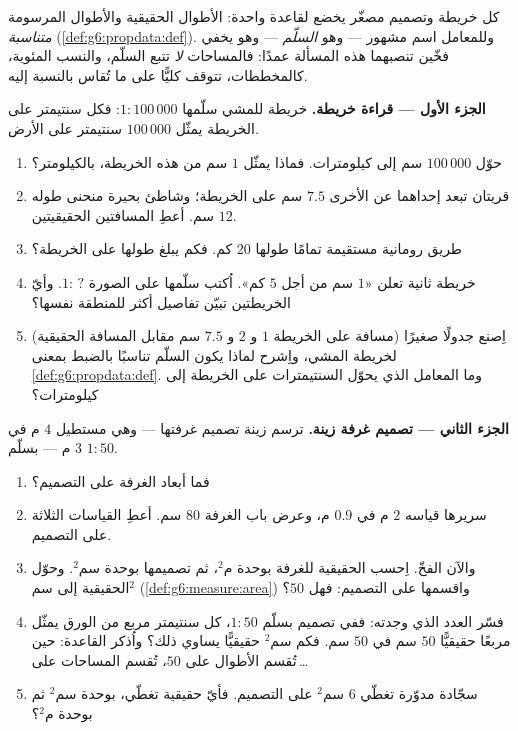 \begin{problem}
\label{pb:g6:propdata:1}
كل خريطة وتصميم  مصغّر يخضع لقاعدة واحدة: الأطوال الحقيقية
والأطوال المرسومة \emph{متناسبة}
(\cref{def:g6:propdata:def}). وللمعامل اسم مشهور
--- وهو \emph{السلّم} --- وهو يخفي فخّين
تنصبهما هذه المسألة عمدًا: فالمساحات \emph{لا} تتبع
السلّم، والنسب المئوية، كالمخططات، تتوقف كليًّا على ما
تُقاس بالنسبة إليه.

\medskip
\noindent\textbf{الجزء الأول --- قراءة خريطة.}
خريطة للمشي سلّمها $1:100\,000$: فكل سنتيمتر على الخريطة
يمثّل $100\,000$ سنتيمتر على الأرض.
\begin{enumerate}
  \item حوّل $100\,000$ سم إلى كيلومترات. فماذا يمثّل $1$ سم
        من هذه الخريطة، بالكيلومتر؟
  \item قريتان تبعد إحداهما عن الأخرى $7.5$ سم على الخريطة؛ وشاطئ
        بحيرة منحنى طوله $12$ سم. أعطِ المسافتين الحقيقيتين.
  \item طريق رومانية مستقيمة تمامًا طولها $20$ كم. فكم يبلغ طولها
        على الخريطة؟
  \item خريطة ثانية تعلن «$1$ سم من أجل $5$ كم». اُكتب
        سلّمها على الصورة $1: \,?$. وأيّ الخريطتين تبيّن
        تفاصيل أكثر للمنطقة نفسها؟
  \item اِصنع جدولًا صغيرًا (مسافة على الخريطة $1$ و $2$ و $7.5$ سم
        مقابل المسافة الحقيقية) لخريطة المشي، واِشرح
        لماذا يكون السلّم تناسبًا بالضبط بمعنى
        \cref{def:g6:propdata:def}. وما المعامل الذي
        يحوّل السنتيمترات على الخريطة إلى كيلومترات؟
\end{enumerate}

\medskip
\noindent\textbf{الجزء الثاني --- تصميم غرفة زينة.}
ترسم زينة تصميم غرفتها --- وهي مستطيل $4$ م في
$3$ م --- بسلّم $1:50$.
\begin{enumerate}[resume]
  \item فما أبعاد الغرفة على التصميم؟
  \item سريرها قياسه $2$ م في $0.9$ م، وعرض باب الغرفة
        $80$ سم. أعطِ القياسات الثلاثة على التصميم.
  \item والآن الفخّ. اِحسب  الحقيقية للغرفة
        بوحدة م$^2$، ثم  تصميمها بوحدة سم$^2$. وحوّل
         الحقيقية إلى سم$^2$
        (\cref{def:g6:measure:area}) واقسمها على 
        التصميم: فهل  $50$؟
  \item فسّر العدد الذي وجدته: ففي تصميم بسلّم $1:50$، كل
        سنتيمتر مربع من الورق يمثّل مربعًا حقيقيًّا
        $50$ سم في $50$ سم. فكم سم$^2$ حقيقيًّا يساوي ذلك؟ واُذكر
        القاعدة: حين تُقسم الأطوال على $50$، تُقسم المساحات
        على\,\dots
  \item سجّادة مدوّرة تغطّي $6$ سم$^2$ على التصميم. فأيّ 
        حقيقية تغطّي، بوحدة سم$^2$ ثم بوحدة م$^2$؟
\end{enumerate}


\end{problem}
